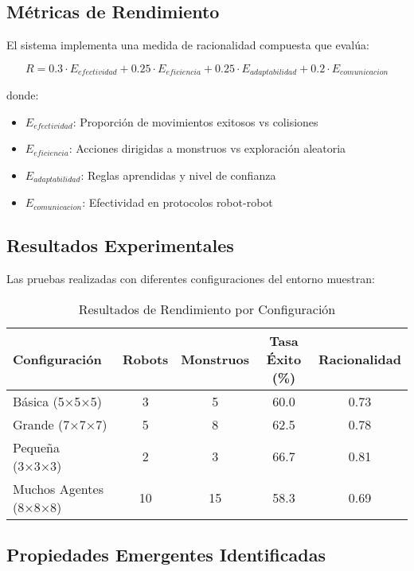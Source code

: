\documentclass[10pt,twocolumn]{article}
\begin{document}
\subsection{Métricas de Rendimiento}

El sistema implementa una medida de racionalidad compuesta que evalúa:

\begin{equation}
R = 0.3 \cdot E_{efectividad} + 0.25 \cdot E_{eficiencia} + 0.25 \cdot E_{adaptabilidad} + 0.2 \cdot E_{comunicacion}
\end{equation}

donde:
\begin{itemize}
\item $E_{efectividad}$: Proporción de movimientos exitosos vs colisiones
\item $E_{eficiencia}$: Acciones dirigidas a monstruos vs exploración aleatoria
\item $E_{adaptabilidad}$: Reglas aprendidas y nivel de confianza
\item $E_{comunicacion}$: Efectividad en protocolos robot-robot
\end{itemize}

\subsection{Resultados Experimentales}

Las pruebas realizadas con diferentes configuraciones del entorno muestran:

\begin{table}[H]
\centering
\caption{Resultados de Rendimiento por Configuración}
\begin{tabular}{@{}lcccc@{}}
\toprule
Configuración & Robots & Monstruos & Tasa Éxito (\%) & Racionalidad \\
\midrule
Básica (5×5×5) & 3 & 5 & 60.0 & 0.73 \\
Grande (7×7×7) & 5 & 8 & 62.5 & 0.78 \\
Pequeña (3×3×3) & 2 & 3 & 66.7 & 0.81 \\
Muchos Agentes (8×8×8) & 10 & 15 & 58.3 & 0.69 \\
\bottomrule
\end{tabular}
\end{table}

\subsection{Propiedades Emergentes Identificadas}
\end{document}
